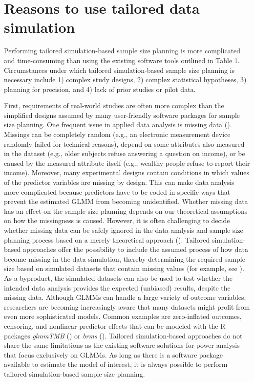 \documentclass[
  man,
  floatsintext,
  longtable,
  a4paper,
  nolmodern,
  notxfonts,
  notimes,
  colorlinks=true,linkcolor=blue,citecolor=blue,urlcolor=blue]{apa7}
\begin{document}
\section{Reasons to use tailored data
simulation}\label{reasons-to-use-tailored-data-simulation}

Performing tailored simulation-based sample size planning is more
complicated and time-consuming than using the existing software tools
outlined in Table 1. Circumstances under which tailored simulation-based
sample size planning is necessary include 1) complex study designs, 2)
complex statistical hypotheses, 3) planning for precision, and 4) lack
of prior studies or pilot data.

First, requirements of real-world studies are often more complex than
the simplified designs assumed by many user-friendly software packages
for sample size planning. One frequent issue in applied data analysis is
missing data (). Missings can be completely random (e.g., an electronic
measurement device randomly failed for technical reasons), depend on
some attributes also measured in the dataset (e.g., older subjects
refuse answering a question on income), or be caused by the measured
attribute itself (e.g., wealthy people refuse to report their income).
Moreover, many experimental designs contain conditions in which values
of the predictor variables are missing by design. This can make data
analysis more complicated because predictors have to be coded in
specific ways that prevent the estimated GLMM from becoming
unidentified. Whether missing data has an effect on the sample size
planning depends on our theoretical assumptions on how the missingness
is caused. However, it is often challenging to decide whether missing
data can be safely ignored in the data analysis and sample size planning
process based on a merely theoretical approach
(). Tailored simulation-based approaches offer the possibility to
include the assumed process of how data become missing in the data
simulation, thereby determining the required sample size based on
simulated datasets that contain missing values (for example, see
).
As a byproduct, the simulated datasets can also be used to test whether
the intended data analysis provides the expected (unbiased) results,
despite the missing data. Although GLMMs can handle a large variety of
outcome variables, researchers are becoming increasingly aware that many
datasets might profit from even more sophisticated models. Common
examples are zero-inflated outcomes, censoring, and nonlinear predictor
effects that can be modeled with the R packages \emph{glmmTMB}
() or
\emph{brms}
().
Tailored simulation-based approaches do not share the same limitations
as the existing software solutions for power analysis that focus
exclusively on GLMMs. As long as there is a software package available
to estimate the model of interest, it is always possible to perform
tailored simulation-based sample size planning.
\end{document}

